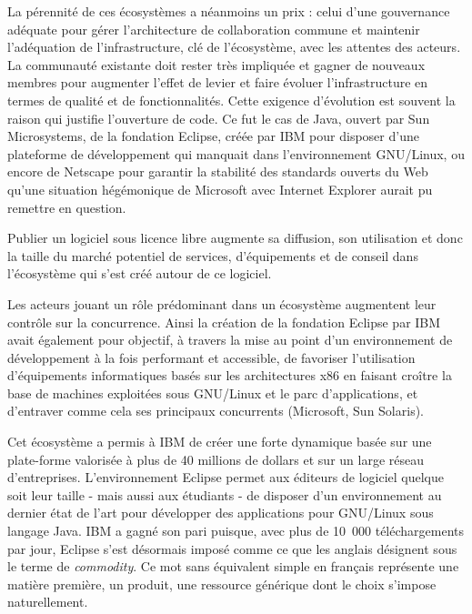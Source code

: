 \documentclass{FramateX}
\begin{document}
\begin{refsection}
La pérennité de ces écosystèmes a néanmoins un prix : celui d'une
gouvernance adéquate pour gérer l'architecture de collaboration commune
et maintenir l'adéquation de l'infrastructure, clé de l'écosystème,
avec les attentes des acteurs. La communauté existante doit rester très
impliquée et gagner de nouveaux membres pour augmenter l'effet de
levier et faire évoluer l'infrastructure en termes de qualité et de
fonctionnalités. Cette exigence d'évolution est souvent la raison qui
justifie l'ouverture de code. Ce fut le cas de Java, ouvert par Sun
Microsystems, de la fondation Eclipse, créée par IBM pour disposer
d'une plateforme de développement qui manquait dans l'environnement
GNU/Linux, ou encore de Netscape pour garantir la stabilité des
standards ouverts du Web qu'une situation hégémonique de Microsoft avec
Internet Explorer aurait pu remettre en question.

Publier un logiciel sous licence libre augmente sa diffusion, son
utilisation et donc la taille du marché potentiel de services,
d'équipements et de conseil dans l'écosystème qui s'est créé autour de
ce logiciel.

Les acteurs jouant un rôle prédominant dans un écosystème augmentent
leur contrôle sur la concurrence. Ainsi la création de la fondation
Eclipse par IBM avait également pour objectif, à travers la mise au
point d'un environnement de développement à la fois performant et
accessible, de favoriser l'utilisation d'équipements informatiques
basés sur les architectures x86 en faisant croître la base de machines
exploitées sous GNU/Linux et le parc d'applications, et d'entraver
comme cela ses principaux concurrents (Microsoft, Sun Solaris). 

Cet écosystème a permis à IBM de créer une forte dynamique basée sur une
plate-forme valorisée à plus de 40 millions de dollars et sur un large
réseau d'entreprises. L'environnement Eclipse permet aux éditeurs de
logiciel quelque soit leur taille - mais aussi aux étudiants - de
disposer d'un environnement au dernier état de l'art pour développer
des applications pour GNU/Linux sous langage Java. IBM a gagné son pari
puisque, avec plus de 10~000 téléchargements par jour, Eclipse s'est
désormais imposé comme ce que les anglais désignent sous le terme de \textit{commodity}. Ce mot sans équivalent simple en français
représente une matière première, un produit, une ressource générique
dont le choix s'impose naturellement.


\end{refsection}
\end{document}
